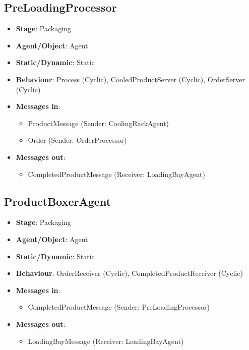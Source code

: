 \documentclass[12pt]{article}
\begin{document}
\subsection{PreLoadingProcessor}
\begin{itemize}
    \item \textbf{Stage}: Packaging
    \item \textbf{Agent/Object}: Agent
    \item \textbf{Static/Dynamic}: Static
    \item \textbf{Behaviour}: Process (Cyclic), CooledProductServer (Cyclic), OrderServer (Cyclic)
    \item \textbf{Messages in}:
        \begin{itemize}
            \item ProductMessage (Sender: CoolingRackAgent)
            \item Order (Sender: OrderProcessor)
        \end{itemize}
    \item \textbf{Messages out}:
        \begin{itemize}
            \item CompletedProductMessage (Receiver: LoadingBayAgent)
        \end{itemize}
\end{itemize}

\subsection{ProductBoxerAgent}
\begin{itemize}
    \item \textbf{Stage}: Packaging
    \item \textbf{Agent/Object}: Agent
    \item \textbf{Static/Dynamic}: Static
    \item \textbf{Behaviour}: OrderReceiver (Cyclic), CompletedProductReceiver (Cyclic)
    \item \textbf{Messages in}:
        \begin{itemize}
            \item CompletedProductMessage (Sender: PreLoadingProcessor)
        \end{itemize}
    \item \textbf{Messages out}:
        \begin{itemize}
            \item LoadingBayMessage (Receiver: LoadingBayAgent)
        \end{itemize}
\end{itemize}
\end{document}
